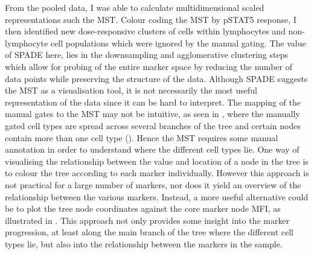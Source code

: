 From the pooled data, I was able to calculate multidimensional scaled representations such the \gls{MST}.  
Colour coding the \gls{MST} by pSTAT5 response, I then identified new dose-responsive clusters of cells within lymphocytes and non-lymphocyte cell populations which were ignored by the manual gating.
The value of \gls{SPADE} here, lies in the downsampling and agglomerative clustering steps which allow for probing of the entire marker space by reducing the number of data points while preserving the structure of the data.
Although \gls{SPADE} suggests the \gls{MST} as a visualisation tool, it is not necessarily the most useful representation of the data since it can be hard to interpret.
The mapping of the manual gates to the MST may not be intuitive, as seen in ,
where the manually gated cell types are spread across several branches of the tree and certain nodes contain more than one cell type ().
Hence the \gls{MST} requires some manual annotation in order to understand where the different cell types lie.
One way of visualising the relationship between the value and location of a node in the tree is to colour the tree according to each marker individually.
However this approach is not practical for a large number of markers, nor does it yield an overview of the relationship between the various markers.
Instead, a more useful alternative could be to plot the tree node coordinates against the core marker node MFI, as illustrated in .
This approach not only provides some insight into the marker progression, at least along the main branch of the tree where the different cell types lie, but also into the relationship between the markers in the sample.
